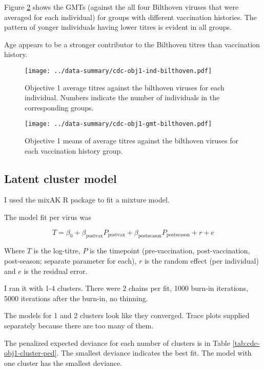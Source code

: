 \documentclass[12pt]{article}
\begin{document}
Figure \ref{fig:cdc-obj1-gmt-bilthoven} shows the GMTs (against the all four Bilthoven viruses that were averaged for each individual) for groups with different vaccination histories. The pattern of yonger individuals having lower titres is evident in all groups.

Age appears to be a stronger contributor to the Bilthoven titres than vaccination history.

\begin{figure}
	\texttt{[image: ../data-summary/cdc-obj1-ind-bilthoven.pdf]}
	\caption{Objective 1 average titres against the bilthoven viruses for each individual. Numbers indicate the number of individuals in the corresponding groups.}
	\label{fig:cdc-obj1-ind-bilthoven}
\end{figure}

\begin{figure}
	\texttt{[image: ../data-summary/cdc-obj1-gmt-bilthoven.pdf]}
	\caption{Objective 1 means of average titres against the bilthoven viruses for each vaccination history group. }
	\label{fig:cdc-obj1-gmt-bilthoven}
\end{figure}

\subsection{Latent cluster model}

I used the mixAK R package to fit a mixture model.

The model fit per virus was

$$
	T = \beta_0 + \beta_{\text{postvax}}P_{\text{postvax}} + \beta_{\text{postseason}}P_{\text{postseason}} + r + e
$$

Where $T$ is the log-titre, $P$ is the timepoint (pre-vaccination, post-vaccination, post-season; separate parameter for each), $r$ is the random effect (per individual) and $e$ is the residual error.

I ran it with 1-4 clusters. There were 2 chains per fit, 1000 burn-in iterations, 5000 iterations after the burn-in, no thinning.

The models for 1 and 2 clusters look like they converged. Trace plots supplied separately because there are too many of them.

The penalized expected deviance for each number of clusters is in Table \ref{tab:cdc-obj1-cluster-ped}. The smallest deviance indicates the best fit. The model with one cluster has the smallest deviance.
\end{document}
